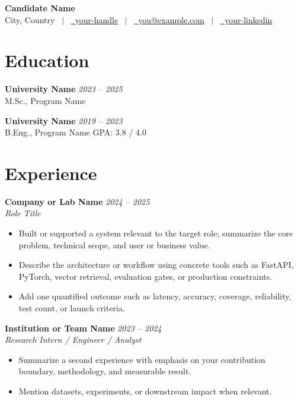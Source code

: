 \documentclass[a4paper,11pt]{extarticle}
\newcommand{\datedentry}[3]{%
  \textbf{#1} \hfill \textit{#2}\\
  \textit{#3}
}
\begin{document}
\pagestyle{empty}

\begin{center}
  {\LARGE\bfseries Candidate Name} \\[4pt]
  {\small
    City, Country \ $|$ \
    \href{https://github.com/your-handle}{\faGithub\ your-handle} \ $|$ \
    \href{mailto:you@example.com}{\faEnvelope\ you@example.com} \ $|$ \
    \href{https://www.linkedin.com/in/your-handle}{\faLinkedin\ your-linkedin}
  }\\[-1pt]
\end{center}

\section{Education}
\textbf{University Name} \hfill \textit{2023 -- 2025}\\
M.Sc., Program Name

\textbf{University Name} \hfill \textit{2019 -- 2023}\\
B.Eng., Program Name \hfill GPA: 3.8 / 4.0

\section{Experience}
\datedentry{Company or Lab Name}{2024 -- 2025}{Role Title}
\vspace{-0.6em}
{\small
\begin{itemize}
  \item Built or supported a system relevant to the target role; summarize the core problem, technical scope, and user or business value.
  \item Describe the architecture or workflow using concrete tools such as FastAPI, PyTorch, vector retrieval, evaluation gates, or production constraints.
  \item Add one quantified outcome such as latency, accuracy, coverage, reliability, test count, or launch criteria.
\end{itemize}
}

\datedentry{Institution or Team Name}{2023 -- 2024}{Research Intern / Engineer / Analyst}
\vspace{-0.6em}
{\small
\begin{itemize}
  \item Summarize a second experience with emphasis on your contribution boundary, methodology, and measurable result.
  \item Mention datasets, experiments, or downstream impact when relevant.
\end{itemize}
}
\end{document}
